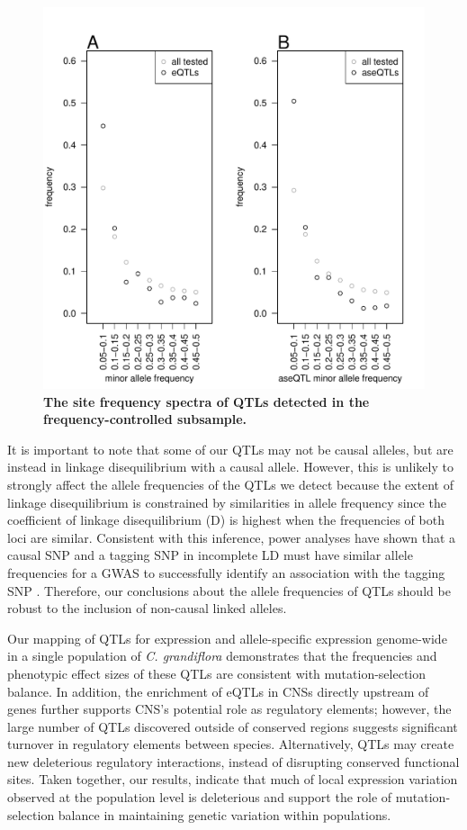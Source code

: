 \begin{figure}[h]
      \centering
       \includegraphics[width=\linewidth]{Ch3Fig5}
    \caption{\textbf{The site frequency spectra of QTLs detected in the frequency-controlled subsample. }}
    \label{fig:3fig5}
\end{figure}


It is important to note that some of our QTLs may not be causal alleles, but are instead in linkage disequilibrium with a causal allele. However, this is unlikely to strongly affect the allele frequencies of the QTLs we detect because the extent of linkage disequilibrium is constrained by similarities in allele frequency since the coefficient of linkage disequilibrium (D) is highest when the frequencies of both loci are similar. Consistent with this inference, power analyses have shown that a causal SNP and a tagging SNP in incomplete LD must have similar allele frequencies for a GWAS to successfully identify an association with the tagging SNP \citep{Zondervan2004-lo}. Therefore, our conclusions about the allele frequencies of QTLs should be robust to the inclusion of non-causal linked alleles. 

Our mapping of QTLs for expression and allele-specific expression genome-wide in a single population of \textit{C. grandiflora} demonstrates that the frequencies and phenotypic effect sizes of these QTLs are consistent with mutation-selection balance. In addition, the enrichment of eQTLs in CNSs directly upstream of genes further supports CNS’s potential role as regulatory elements; however, the large number of QTLs discovered outside of conserved regions suggests significant turnover in regulatory elements between species. Alternatively, QTLs may create new deleterious regulatory interactions, instead of disrupting conserved functional sites. Taken together, our results, indicate that much of local expression variation observed at the population level is deleterious and support the role of mutation-selection balance in maintaining genetic variation within populations.


